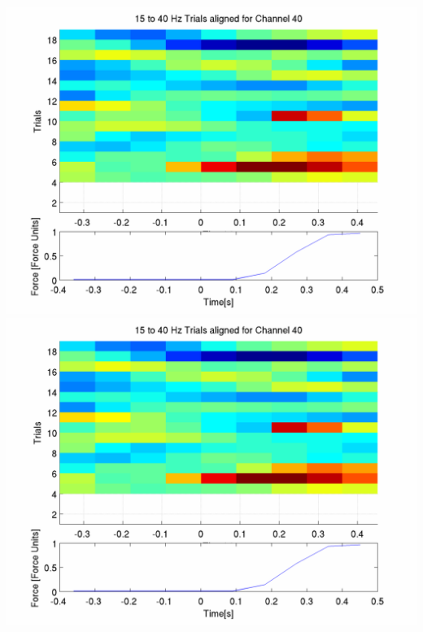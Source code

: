 \documentclass[12pt]{article}
\begin{document}
\includegraphics[scale=0.2]{noCAR/log_plot_3_aligned_trials.png}
\includegraphics[scale=0.2]{WithCAR/log_plot_3_aligned_trials.png}
\end{document}
